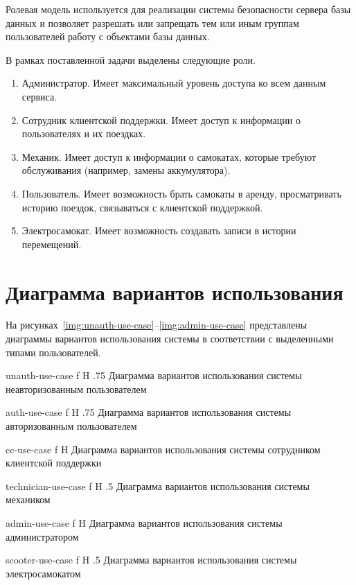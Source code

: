Ролевая модель используется для реализации системы безопасности сервера базы данных и позволяет разрешать или запрещать тем или иным группам пользователей работу с объектами базы данных.

В рамках поставленной задачи выделены следующие роли.

\begin{enumerate}
    \item Администратор. Имеет максимальный уровень доступа ко всем данным сервиса.
    \item Сотрудник клиентской поддержки. Имеет доступ к информации о пользователях и их поездках.
    \item Механик. Имеет доступ к информации о самокатах, которые требуют обслуживания (например, замены аккумулятора).
    \item Пользователь. Имеет возможность брать самокаты в аренду, просматривать историю поездок, связываться с клиентской поддержкой.
    \item Электросамокат. Имеет возможность создавать записи в истории перемещений.
\end{enumerate}

\section{Диаграмма вариантов использования}

На рисунках~\ref{img:unauth-use-case}--\ref{img:admin-use-case} представлены диаграммы вариантов использования системы в соответствии с выделенными типами пользователей.

    {unauth-use-case}
    {f}
    {H}
    {.75\textwidth}
    {Диаграмма вариантов использования системы неавторизованным пользователем}

    {auth-use-case}
    {f}
    {H}
    {.75\textwidth}
    {Диаграмма вариантов использования системы авторизованным пользователем}

    {cc-use-case}
    {f}
    {H}
    {\textwidth}
    {Диаграмма вариантов использования системы сотрудником клиентской поддержки}

    {technician-use-case}
    {f}
    {H}
    {.5\textwidth}
    {Диаграмма вариантов использования системы механиком}

    {admin-use-case}
    {f}
    {H}
    {\textwidth}
    {Диаграмма вариантов использования системы администратором}

    {scooter-use-case}
    {f}
    {H}
    {.5\textwidth}
    {Диаграмма вариантов использования системы электросамокатом}

